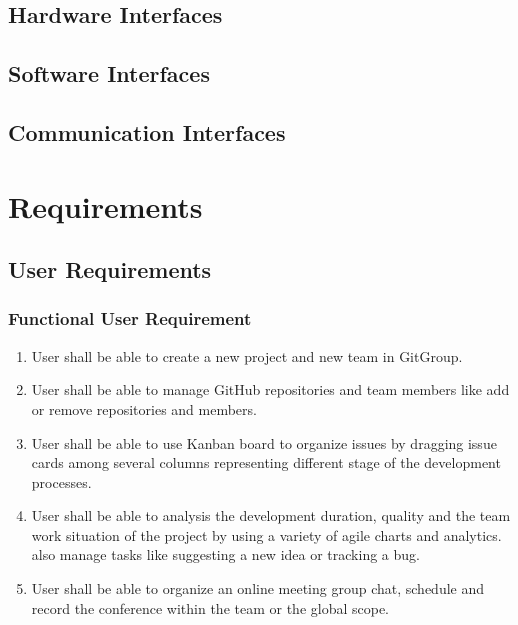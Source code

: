 \documentclass[12pt,a4paper]{report}
\begin{document}
\section{Hardware Interfaces}
\section{Software Interfaces}
\section{Communication Interfaces}


\chapter{Requirements}
\section{User Requirements}
	\subsection{Functional User Requirement}
		\begin{enumerate}
			\renewcommand{\labelenumi}{{\textbf{\arabic{enumi}.}}}
			\item User shall be able to create a new project and new team in GitGroup.
			\item User shall be able to manage GitHub repositories and team members like add or remove repositories and members.
			\item User shall be able to use Kanban board to organize issues by dragging issue cards among several columns representing different stage of the development processes.
			\item User shall be able to analysis the development duration, quality and the team work situation of the project by using a variety of agile charts and analytics.
			also manage tasks like suggesting a new idea or tracking a bug. 
			\item User shall be able to organize an online meeting group chat, schedule and record the conference within the team or the global scope.
		\end{enumerate}
\end{document}
